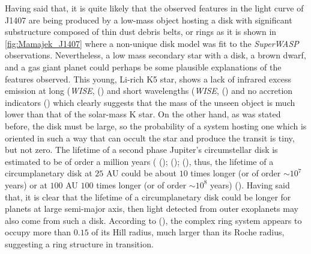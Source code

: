 Having said that, it is quite likely that the observed features  in the light curve of J1407 are being produced by a low-mass object hosting a disk with significant substructure composed of thin dust debris belts, or rings as it is shown in \autoref{fig:Mamajek_J1407} where a non-unique disk model was fit to the \textit{SuperWASP} observations. Nevertheless, a low mass secondary star with a disk, a brown dwarf, and a gas giant planet could perhaps be some plausible explanations of the features observed. This young, Li-rich K5 star, shows a lack of infrared excess emission at long (\textit{WISE},  (\citeyear{2010AJ....140.1868W}) and short wavelengths (\textit{WISE},  (\citeyear{2006AJ....131.1163S})  and no accretion indicators (\citeyear{2012AJ....143...72M}) which clearly suggests that the mass of the unseen object is much lower than that of the solar-mass K star. On the other hand, as was stated before, the disk must be large, so the probability of a system hosting one which is oriented in such a way that can occult the star and produce the transit is tiny, but not zero. The lifetime of a second phase Jupiter's circumstellar disk is estimated to be of order a million years ( (\citeyear{2009euro.book...59C});  (\citeyear{2005A&A...434..343A});  (\citeyear{2010AJ....140.1168W}), thus, the lifetime of a circumplanetary disk at $25$ AU could be about $10$ times longer (or of order $\sim10^7$ years) or at $100$ AU $100$ times longer (or of order $\sim10^8$ years)  (\citeyear{2012AJ....143...72M}). Having said that, it is clear that the lifetime of a circumplanetary disk could be longer for planets at large semi-major axis, then light detected from outer exoplanets may also come from such a disk. According to  (\citeyear{2015MNRAS.446..411K}), the complex ring system appears to occupy more than $0.15$ of its Hill radius, much larger than its Roche radius, suggesting a ring structure in transition.\\

